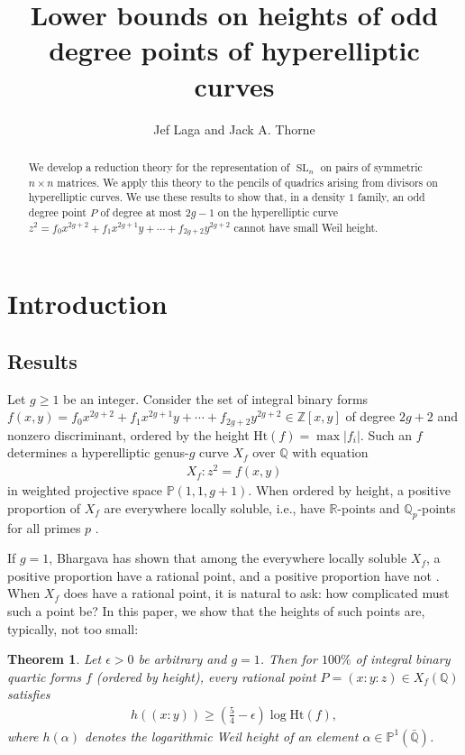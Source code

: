 \documentclass{article} %
\title{Lower bounds on heights of odd degree points of hyperelliptic curves}
\author{Jef Laga and Jack A. Thorne}
\newtheorem{theorem}[proposition]{Theorem}
\numberwithin{equation}{section}
\DeclareMathOperator{\SL}{SL}
\renewcommand{\P}{\mathbb{P}}
\newcommand{\R}{\mathbb{R}}
\newcommand{\Q}{\mathbb{Q}}
\newcommand{\Z}{\mathbb{Z}}
\newcommand{\height}{\mathrm{Ht}}
\begin{document}
\maketitle

\begin{abstract}
    We develop a reduction theory for the representation of $\SL_n$ on pairs of symmetric $n\times n$ matrices.
    We apply this theory to the pencils of quadrics arising from divisors on hyperelliptic curves.
    We use these results to show that, in a density $1$ family, an odd degree point $P$ of degree at most $2g-1$ on the hyperelliptic curve $z^2 = f_0x^{2g+2} + f_1 x^{2g+1} y + \cdots + f_{2g+2}y^{2g+2}$ cannot have small Weil height.
\end{abstract}

\tableofcontents



\section{Introduction}



\subsection{Results}
Let $g\geq 1$ be an integer.
Consider the set of integral binary forms $f(x,y) = f_0x^{2g+2}  +f_1 x^{2g+1}y + \cdots + f_{2g+2} y^{2g+2} \in \Z[x,y]$ of degree $2g+2$ and nonzero discriminant, ordered by the height $\height(f) = \max |f_i|$. 
Such an $f$ determines a hyperelliptic genus-$g$ curve $X_f$ over $\Q$ with equation 
\begin{align}\label{eq_introhyperellipticcurve}
    X_f \colon z^2 = f(x,y) 
\end{align}
in weighted projective space $\P(1,1,g+1)$.
When ordered by height, a positive proportion of $X_f$ are everywhere locally soluble, i.e., have $\R$-points and $\Q_p$-points for all primes $p$ \cite{PoonenStoll-localglobaldensities}.

If $g=1$, Bhargava has shown that among the everywhere locally soluble $X_f$, a positive proportion have a rational point, and a positive proportion have not \cite{Bhargava-hasseprincipleplanecubics}.
When $X_f$ does have a rational point, it is natural to ask: how complicated must such a point be?
In this paper, we show that the heights of such points are, typically, not too small: 
\begin{theorem}\label{theorem_intro1}
    Let $\epsilon>0$ be arbitrary and $g=1$.
    Then for $100\%$ of integral binary quartic forms $f$ (ordered by height), every rational point $P = (x:y:z)\in X_f(\Q)$ satisfies 
    \begin{align}
        h((x:y)) \geq \left(\frac{5}{4}- \epsilon\right) \log \height(f),
    \end{align}
    where $h(\alpha)$ denotes the logarithmic Weil height of an element $\alpha \in \P^1(\bar{\Q})$.
\end{theorem}
\end{document}
